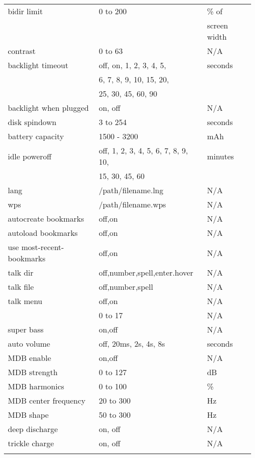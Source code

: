 \begin{center}
\begin{longtable}{@{}lll@{}}
    bidir limit & 0 to 200 & \% of \\
                &          & screen width\\
    contrast & 0 to 63 & N/A\\
    backlight timeout & off, on, 1, 2, 3, 4, 5, & seconds\\
                      & 6, 7, 8, 9, 10, 15, 20, & \\
                      & 25, 30, 45, 60, 90 & \\
    backlight when plugged & on, off & N/A\\
    disk spindown & 3 to 254 & seconds\\
    battery capacity & 1500 - 3200 & mAh\\
    idle poweroff & off, 1, 2, 3, 4, 5, 6, 7, 8, 9, 10, & minutes\\
                  & 15, 30, 45, 60 & \\
    lang & /path/filename.lng & N/A\\
    wps & /path/filename.wps & N/A\\
    autocreate bookmarks & off,on & N/A\\
    autoload bookmarks & off,on & N/A\\
    use most-recent-bookmarks & off,on & N/A\\
    talk dir & off,number,spell,enter.hover & N/A\\
    talk file & off,number,spell & N/A\\
    talk menu & off,on & N/A\\

    \opt{recorder,recorderv2fm}{
      loudness & 0 to 17 & N/A\\
      super bass & on,off & N/A\\
      auto volume & off, 20ms, 2s, 4s, 8s & seconds\\
      MDB enable & on,off & N/A\\
      MDB strength & 0 to 127 & dB\\
      MDB harmonics & 0 to 100 & \%\\
      MDB center frequency & 20 to 300 & Hz\\
      MDB shape & 50 to 300 & Hz\\
      deep discharge & on, off & N/A\\
      trickle charge & on, off & N/A\\
    }


\end{longtable}
\end{center}
